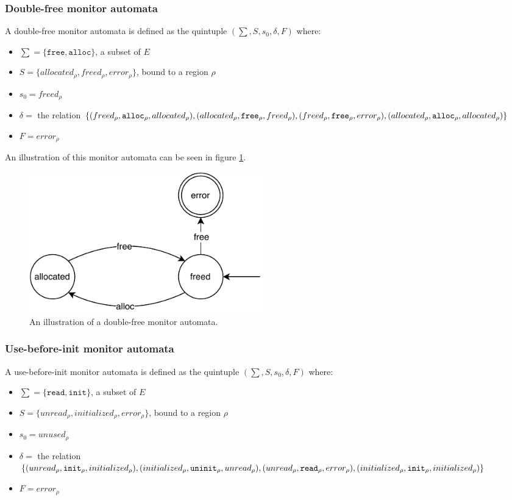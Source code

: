 \subsubsection{Double-free monitor automata}

A double-free monitor automata is defined as the quintuple $(\sum, S, s_0, \delta, F)$ where: 

\begin{itemize}
    \item $\sum = \{\texttt{free}, \texttt{alloc}\}$, a subset of $E$
    \item $S = \{ allocated_\rho, freed_\rho, error_\rho \}$, bound to a region $\rho$
    \item $s_0 = freed_\rho$ 
    \item $\delta =$ the relation $\{(freed_\rho, \texttt{alloc}_\rho, allocated_\rho), (allocated_\rho, \texttt{free}_\rho, freed_\rho), \\
    (freed_\rho, \texttt{free}_\rho, error_\rho), (allocated_\rho, \texttt{alloc}_\rho, allocated_\rho)\}$ 
    \item $F = error_\rho$  
\end{itemize}

An illustration of this monitor automata can be seen in figure \ref{double-free-automata}. 

\begin{figure}[H]
    \centering
    \includegraphics[width=0.5\textwidth]{background/figures/double-free}
    \caption{An illustration of a double-free monitor automata.}
    \label{double-free-automata}
\end{figure}

\subsubsection{Use-before-init monitor automata}

A use-before-init monitor automata is defined as the quintuple $(\sum, S, s_0, \delta, F)$ where: 

\begin{itemize}
    \item $\sum = \{\texttt{read}, \texttt{init}\}$, a subset of $E$
    \item $S = \{ unread_\rho, initialized_\rho, error_\rho \}$, bound to a region $\rho$
    \item $s_0 = unused_\rho$ 
    \item $\delta =$ the relation $\{(unread_\rho, \texttt{init}_\rho, initialized_\rho), (initialized_\rho, \texttt{uninit}_\rho, unread_\rho), \\
    (unread_\rho, \texttt{read}_\rho, error_\rho), (initialized_\rho, \texttt{init}_\rho, initialized_\rho)\}$ 
    \item $F = error_\rho$  
\end{itemize}

